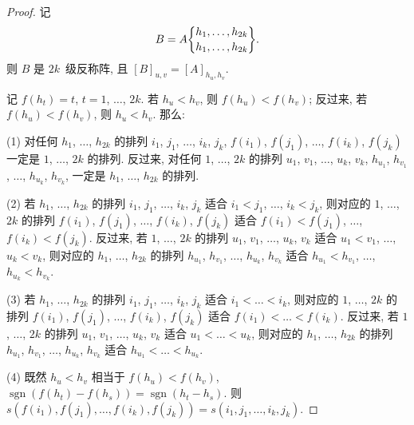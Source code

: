 \documentclass[../libro.tex]{subfiles}
\begin{document}
\begin{proof}
    记
    \begin{align*}
        B = A\submat{h_1,\dots,h_{2k}}{h_1,\dots,h_{2k}}.
    \end{align*}
    则 \(B\) 是 \(2k\)~级反称阵,
    且 \([B]_{u,v} = [A]_{h_u,h_v}\).

    记 \(f(h_t) = t\), \(t = 1\), \(\dots\), \(2k\).
    若 \(h_u < h_v\), 则 \(f(h_u) < f(h_v)\);
    反过来, 若 \(f(h_u) < f(h_v)\), 则 \(h_u < h_v\).
    那么:

    (1)
    对任何 \(h_1\), \(\dots\), \(h_{2k}\) 的排列
    \(i_1\), \(j_1\), \(\dots\), \(i_k\), \(j_k\),
    \(f(i_1)\), \(f(j_1)\), \(\dots\), \(f(i_k)\), \(f(j_k)\)
    一定是 \(1\), \(\dots\), \(2k\) 的排列.
    反过来, 对任何 \(1\), \(\dots\), \(2k\) 的排列
    \(u_1\), \(v_1\), \(\dots\), \(u_k\), \(v_k\),
    \(h_{u_1}\), \(h_{v_1}\), \(\dots\), \(h_{u_k}\), \(h_{v_k}\),
    一定是 \(h_1\), \(\dots\), \(h_{2k}\) 的排列.

    (2)
    若 \(h_1\), \(\dots\), \(h_{2k}\) 的排列
    \(i_1\), \(j_1\), \(\dots\), \(i_k\), \(j_k\)
    适合
    \(i_1 < j_1\), \(\dots\), \(i_k < j_k\),
    则对应的 \(1\), \(\dots\), \(2k\) 的排列
    \(f(i_1)\), \(f(j_1)\), \(\dots\), \(f(i_k)\), \(f(j_k)\)
    适合
    \(f(i_1) < f(j_1)\), \(\dots\), \(f(i_k) < f(j_k)\).
    反过来, 若 \(1\), \(\dots\), \(2k\) 的排列
    \(u_1\), \(v_1\), \(\dots\), \(u_k\), \(v_k\)
    适合
    \(u_1 < v_1\), \(\dots\), \(u_k < v_k\),
    则对应的 \(h_1\), \(\dots\), \(h_{2k}\) 的排列
    \(h_{u_1}\), \(h_{v_1}\), \(\dots\), \(h_{u_k}\), \(h_{v_k}\)
    适合
    \(h_{u_1} < h_{v_1}\), \(\dots\), \(h_{u_k} < h_{v_k}\).

    (3)
    若 \(h_1\), \(\dots\), \(h_{2k}\) 的排列
    \(i_1\), \(j_1\), \(\dots\), \(i_k\), \(j_k\)
    适合
    \(i_1 < \dots < i_k\),
    则对应的 \(1\), \(\dots\), \(2k\) 的排列
    \(f(i_1)\), \(f(j_1)\), \(\dots\), \(f(i_k)\), \(f(j_k)\)
    适合
    \(f(i_1) < \dots < f(i_k)\).
    反过来, 若 \(1\), \(\dots\), \(2k\) 的排列
    \(u_1\), \(v_1\), \(\dots\), \(u_k\), \(v_k\)
    适合
    \(u_1 < \dots < u_k\),
    则对应的 \(h_1\), \(\dots\), \(h_{2k}\) 的排列
    \(h_{u_1}\), \(h_{v_1}\), \(\dots\), \(h_{u_k}\), \(h_{v_k}\)
    适合
    \(h_{u_1} < \dots < h_{u_k}\).

    (4)
    既然 \(h_u < h_v\) 相当于 \(f(h_u) < f(h_v)\),
    \(\operatorname{sgn} {(f(h_t) - f(h_s))}
    = \operatorname{sgn} {(h_t - h_s)}\).
    则
    \(s(f(i_1), f(j_1), \dots, f(i_k), f(j_k))
    = s(i_1, j_1, \dots, i_k, j_k)\).


\end{proof}
\end{document}
